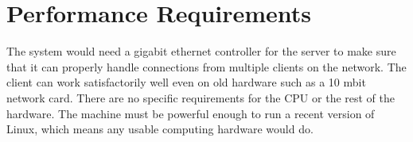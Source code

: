 \section{Performance Requirements}
The system would need a gigabit ethernet controller for the server to make sure
that it can properly handle connections from multiple clients on the network.
The client can work satisfactorily well even on old hardware such as a 10 mbit
network card. There are no specific requirements for the CPU or the rest of the
hardware. The machine must be powerful enough to run a recent version of Linux,
which means any usable computing hardware would do.

